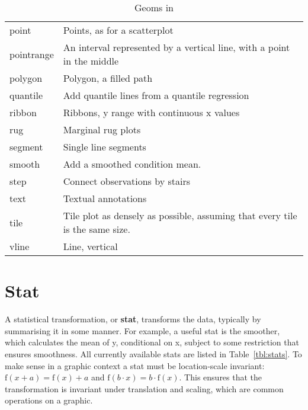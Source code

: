 \begin{table}
\begin{center}
\begin{tabular}{lp{3in}}
      point        & Points, as for a scatterplot                                                 \\
      pointrange   & An interval represented by a vertical line, with a point in the middle       \\
      polygon      & Polygon, a filled path                                                       \\
      quantile     & Add quantile lines from a quantile regression                                \\
      ribbon       & Ribbons, y range with continuous x values                                    \\
      rug          & Marginal rug plots                                                           \\
      segment      & Single line segments                                                         \\
      smooth       & Add a smoothed condition mean.                                               \\
      step         & Connect observations by stairs                                               \\
      text         & Textual annotations                                                          \\
      tile         & Tile plot as densely as possible, assuming that every tile is the same size. \\
      vline        & Line, vertical                                                               \\
  
      \bottomrule
  \end{tabular}
  \end{center}
  \caption{Geoms in \ggplot}
  \label{tbl:geoms}
\end{table}


\section{Stat}
\label{sec:stat}

A statistical transformation, or {\bf stat}, transforms the data, typically by summarising it in some manner.  For example, a useful stat is the smoother, which calculates the mean of y, conditional on x, subject to some restriction that ensures smoothness. All currently available stats are listed in Table~\ref{tbl:stats}.  To make sense in a graphic context a stat must be location-scale invariant: $\mbox{f}(x + a) = \mbox{f}(x) + a$ and $\mbox{f}(b \cdot x) = b \cdot \mbox{f}(x)$.  This ensures that the transformation is invariant under translation and scaling, which are common operations on a graphic.

